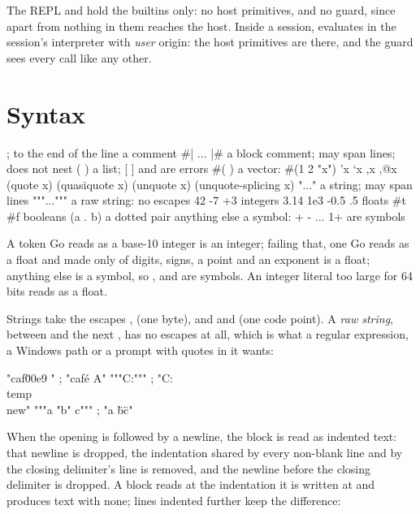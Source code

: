 The REPL and  hold the builtins only: no host primitives, and no
guard, since apart from  nothing in them reaches the host. Inside
a session,  evaluates in the session's interpreter with
\emph{user} origin: the host primitives are there, and the guard sees every
call like any other.

\section{Syntax}

\begin{txt}
; to the end of the line     a comment
#| ... |#                    a block comment; may span lines; does not nest
( )                          a list; [ ] and { } are errors
#( )                         a vector: #(1 2 "x")
'x  `x  ,x  ,@x              (quote x) (quasiquote x) (unquote x) (unquote-splicing x)
"..."                        a string; may span lines
"""..."""                    a raw string: no escapes
42  -7  +3                   integers
3.14  1e3  -0.5  .5          floats
#t  #f                       booleans
(a . b)                      a dotted pair
anything else                a symbol: + - ... 1+ are symbols
\end{txt}

A token Go reads as a base-10 integer is an integer; failing that, one Go
reads as a float and made only of digits, signs, a point and an exponent is
a float; anything else is a symbol, so ,  and
 are symbols. An integer literal too large for 64 bits reads as
a float.

Strings take the escapes  \code{\textbackslash\textbackslash}
  ,
 (one byte), and  and
 (one code point). A \emph{raw string},
between  and the next , has no escapes at all, which is
what a regular expression, a Windows path or a prompt with quotes in it
wants:

\begin{scm}
"caf\u00e9 "          ; "café A"
"""C:\temp\new"""         ; "C:\\temp\\new"
"""a "b" c"""             ; "a \"b\" c"
\end{scm}

When the opening  is followed by a newline, the block is read as
indented text: that newline is dropped, the indentation shared by every
non-blank line and by the closing delimiter's line is removed, and the
newline before the closing delimiter is dropped. A block reads at the
indentation it is written at and produces text with none; lines indented
further keep the difference:

